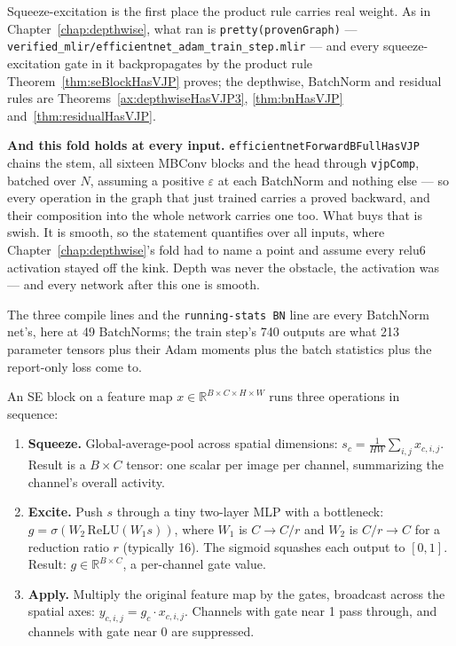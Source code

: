 Squeeze-excitation is the first place the product rule carries real
weight. As in Chapter~\ref{chap:depthwise}, what ran is
\texttt{pretty(provenGraph)} ---
\texttt{verified\_mlir/efficientnet\_adam\_train\_step.mlir} --- and
every squeeze-excitation gate in it backpropagates by the product rule
Theorem~\ref{thm:seBlockHasVJP} proves; the depthwise, BatchNorm and residual rules are
Theorems~\ref{ax:depthwiseHasVJP3}, \ref{thm:bnHasVJP} and~\ref{thm:residualHasVJP}.

\medskip\noindent\textbf{And this fold holds at every input.}
\texttt{efficientnetForwardBFullHasVJP} chains the stem, all
sixteen MBConv blocks and the head through \texttt{vjpComp},
batched over \(N\), assuming a positive \(\varepsilon\) at each BatchNorm
and nothing else --- so every operation in the graph that just trained
carries a proved backward, and their composition into the whole network
carries one too. What buys that is swish. It is smooth, so the statement
quantifies over all inputs, where Chapter~\ref{chap:depthwise}'s fold had to name a point and assume
every relu6 activation stayed off the kink. Depth was never the obstacle, the activation was --- and every
network after this one is smooth.

The three compile lines and the \texttt{running-stats BN} line are every
BatchNorm net's, here at 49 BatchNorms; the train step's 740
outputs are what 213 parameter tensors plus their Adam moments plus the
batch statistics plus the report-only loss come to.


An SE block on a feature map \(x \in \mathbb{R}^{B \times C \times H \times W}\)
runs three operations in sequence:

\begin{enumerate}
\item \textbf{Squeeze.} Global-average-pool across spatial
  dimensions: \(s_c = \frac{1}{HW} \sum_{i,j} x_{c, i, j}\). Result
  is a \(B \times C\) tensor: one scalar per image per channel,
  summarizing the channel's overall activity.

\item \textbf{Excite.} Push \(s\) through a tiny two-layer MLP with
  a bottleneck:
  \(g = \sigma(W_2\, \mathrm{ReLU}(W_1 s))\), where \(W_1\) is
  \(C \to C/r\) and \(W_2\) is \(C/r \to C\) for a reduction ratio
  \(r\) (typically 16). The sigmoid squashes each output to
  \([0, 1]\). Result: \(g \in \mathbb{R}^{B \times C}\), a per-channel
  gate value.

\item \textbf{Apply.} Multiply the original feature map by the
  gates, broadcast across the spatial axes:
  \(y_{c, i, j} = g_c \cdot x_{c, i, j}\). Channels with gate near
  1 pass through, and channels with gate near 0 are suppressed.
\end{enumerate}

